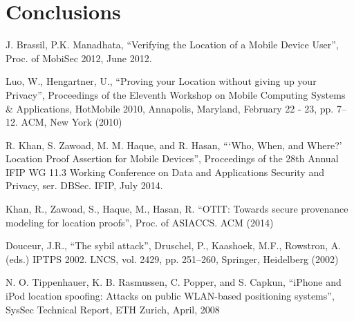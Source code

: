 \documentclass[12pt]{article}
\begin{document}
\section{Conclusions}

\begin{thebibliography}{9}

  J. Brassil, P.K. Manadhata,
  ``Verifying the Location of a Mobile Device User'',
  Proc. of MobiSec 2012,
  June 2012.

  Luo, W., Hengartner, U.,
  ``Proving your Location without giving up your Privacy'',
  Proceedings of the Eleventh Workshop on Mobile Computing Systems \& Applications,
  HotMobile 2010, Annapolis, Maryland, February 22 - 23, pp. 7–12. ACM,
  New York (2010)

  R. Khan, S. Zawoad, M. M. Haque, and R. Hasan,
  ```Who, When, and Where?' Location Proof Assertion for Mobile Devices'',
  Proceedings of the 28th Annual IFIP WG 11.3 Working Conference on Data and Applications Security and Privacy, ser. DBSec. IFIP,
  July 2014.
 
  Khan, R., Zawoad, S., Haque, M., Hasan, R.
  ``OTIT: Towards secure provenance modeling for location proofs'',
  Proc. of ASIACCS. ACM (2014)

  Douceur, J.R.,
  ``The sybil attack'',
  Druschel, P., Kaashoek, M.F., Rowstron, A. (eds.) IPTPS 2002. LNCS, vol. 2429, pp. 251–260,
  Springer, Heidelberg (2002)

  N. O. Tippenhauer, K. B. Rasmussen, C. Popper, and S. Capkun,
  ``iPhone and iPod location spoofing: Attacks on public WLAN-based positioning systems'',
  SysSec Technical Report,
  ETH Zurich, April, 2008

\end{thebibliography}
\end{document}
